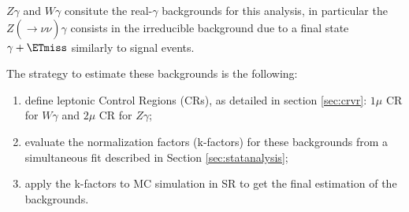 
$Z\gamma$ and $W\gamma$  consitute the real-$\gamma$ backgrounds for this analysis, in particular the $Z(\xrightarrow[]{}\nu\nu)\gamma$ consists in the irreducible background due to a final state $\gamma+\ETmiss$ similarly to signal events.

The strategy to estimate these backgrounds is the following:
\begin{enumerate}
    \item define leptonic Control Regions (CRs), as detailed in section \ref{sec:crvr}: $1\mu$ CR for $W\gamma$ and $2\mu$ CR for $Z\gamma$; 
    \item evaluate the normalization factors (k-factors) for these backgrounds from a simultaneous fit described in Section \ref{sec:statanalysis};
    \item apply the k-factors to MC simulation in SR to get the final estimation of the backgrounds. 
\end{enumerate}